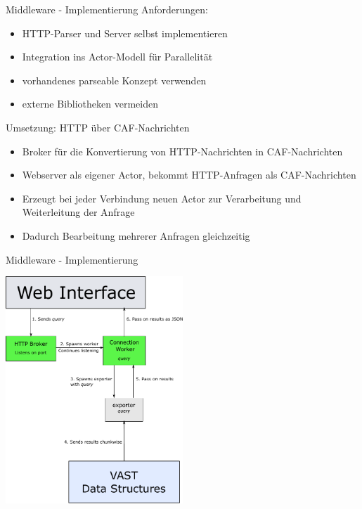 \documentclass[9pt]{beamer}
\begin{document}
\begin{frame}{Middleware - Implementierung}{}
	Anforderungen:
	\begin{itemize}
		\item HTTP-Parser und Server selbst implementieren
		\item Integration ins Actor-Modell für Parallelität
		\item vorhandenes parseable Konzept verwenden
		\item externe Bibliotheken vermeiden
	\end{itemize}
	Umsetzung: HTTP über CAF-Nachrichten
	\begin{itemize}
		\item Broker für die Konvertierung von HTTP-Nachrichten in CAF-Nachrichten
		\item Webserver als eigener Actor, bekommt HTTP-Anfragen als CAF-Nachrichten
		\item Erzeugt bei jeder Verbindung neuen Actor zur Verarbeitung und Weiterleitung der Anfrage
		\item Dadurch Bearbeitung mehrerer Anfragen gleichzeitig
	\end{itemize}
\end{frame}
\begin{frame}{Middleware - Implementierung}{}
	\begin{center}
		\includegraphics[width=0.5\textwidth]{res/swp_vast_detail.pdf}
	\end{center}
\end{frame}
\end{document}
